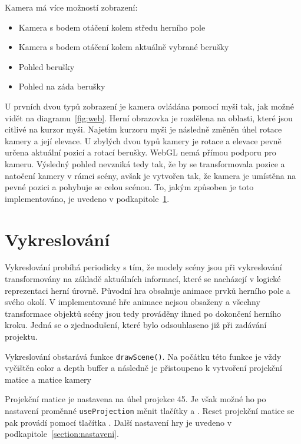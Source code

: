 Kamera má více možností zobrazení:

\begin{itemize}
\item Kamera s bodem otáčení kolem středu herního pole
\item Kamera s bodem otáčení kolem aktuálně vybrané berušky
\item Pohled berušky
\item Pohled na záda berušky
\end{itemize}

U prvních dvou typů zobrazení je kamera ovládána pomocí myši tak, jak možné vidět na diagramu~\ref{fig:web}. Herní obrazovka je rozdělena na oblasti, které jsou citlivé na kurzor myši. Najetím kurzoru myši je následně změněn úhel rotace kamery a její elevace. U zbylých dvou typů kamery je rotace a elevace pevně určena aktuální pozicí a rotací berušky. WebGL nemá přímou podporu pro kameru. Výsledný pohled nevzniká tedy tak, že by se transformovala pozice a natočení kamery v rámci scény, avšak je vytvořen tak, že kamera je umístěna na pevné pozici a pohybuje se celou scénou. To, jakým způsoben je toto implementováno, je uvedeno v podkapitole~\ref{implementace:vykreslovani}. 

\section{Vykreslování}
\label{implementace:vykreslovani}
Vykreslování probíhá periodicky s tím, že modely scény jsou při vykreslování transformovány na základě aktuálních informací, které se nacházejí v logické reprezentaci herní úrovně. Původní hra obsahuje animace prvků herního pole a svého okolí. V implementované hře animace nejsou obsaženy a všechny transformace objektů scény jsou tedy prováděny ihned po dokončení herního kroku. Jedná se o zjednodušení, které bylo odsouhlaseno již při zadávání projektu.  

Vykreslování obstarává funkce \texttt{drawScene()}. Na počátku této funkce je vždy vyčištěn color a depth buffer a následně je přistoupeno k vytvoření projekční matice a matice kamery

Projekční matice je nastavena na úhel projekce 45\degree. Je však možné ho po nastavení proměnné \texttt{useProjection} měnit tlačítky \keystroke{[} a \keystroke{]}. Reset projekční matice se pak provádí pomocí tlačítka . Další nastavení hry je uvedeno v podkapitole~\ref{section:nastaveni}.

